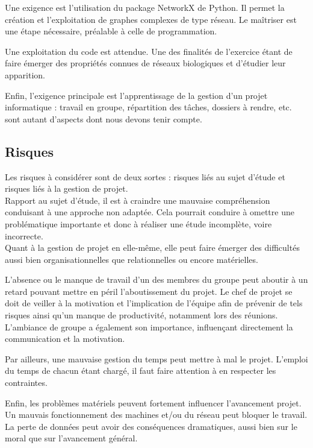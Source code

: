 Une exigence est l'utilisation du package NetworkX de Python. Il permet la création et l'exploitation de graphes complexes de type réseau. Le maîtriser est une étape nécessaire, préalable à celle de programmation.

Une exploitation du code est attendue. Une des finalités de l'exercice étant de faire émerger des propriétés connues de réseaux biologiques et d'étudier leur apparition.

Enfin, l'exigence principale est l'apprentissage de la gestion d'un projet informatique : travail en groupe, répartition des tâches, dossiers à rendre, etc. sont autant d'aspects dont nous devons tenir compte.

\subsection{Risques}
Les risques à considérer sont de deux sortes : risques liés au sujet d'étude et risques liés à la gestion de projet.\\

Rapport au sujet d'étude, il est à craindre une mauvaise compréhension conduisant à une approche non adaptée. Cela pourrait conduire à omettre une problématique importante et donc à réaliser une étude incomplète, voire incorrecte.\\

Quant à la gestion de projet en elle-même, elle peut faire émerger des difficultés aussi bien organisationnelles que relationnelles ou encore matérielles.

L'absence ou le manque de travail d'un des membres du groupe peut aboutir à un retard pouvant mettre en péril l'aboutissement du projet. Le chef de projet se doit de veiller à la motivation et l'implication de l'équipe afin de prévenir de tels risques ainsi qu'un manque de productivité, notamment lors des réunions. L'ambiance de groupe a également son importance, influençant directement la communication et la motivation.

Par ailleurs, une mauvaise gestion du temps peut mettre à mal le projet. L'emploi du temps de chacun étant chargé, il faut faire attention à en respecter les contraintes.

Enfin, les problèmes matériels peuvent fortement influencer l'avancement projet. Un mauvais fonctionnement des machines et/ou du réseau peut bloquer le travail. La perte de données peut avoir des conséquences dramatiques, aussi bien sur le moral que sur l'avancement général.

